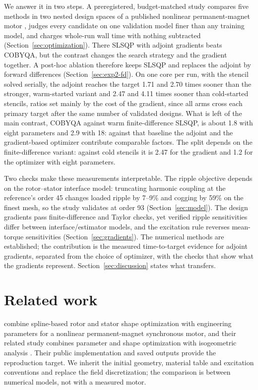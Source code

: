 \documentclass{anvil-paper}
\begin{document}
We answer it in two steps. A preregistered, budget-matched study compares
five methods in two nested design spaces of a published nonlinear
permanent-magnet motor \citep{wiesheu2024spline}, judges every candidate
on one validation model finer than any training model, and charges
whole-run wall time with nothing subtracted (Section~\ref{sec:optimization}).
There SLSQP with adjoint gradients beats COBYQA, but the contrast changes
the search strategy and the gradient together. A post-hoc ablation
therefore keeps SLSQP and replaces the adjoint by forward differences
(Section~\ref{sec:exp2-fd}). On one core per run, with the stencil solved
serially, the adjoint reaches the target 1.71 and 2.70 times sooner than
the stronger, warm-started variant and 2.47 and 4.11 times sooner than
cold-started stencils, ratios set mainly by the cost of the gradient, since
all arms cross each primary target after the same number of validated
designs.
What is left of the main contrast, COBYQA against warm finite-difference
SLSQP, is about 1.8 with eight parameters and 2.9 with 18: against that
baseline the adjoint and the gradient-based optimizer contribute comparable
factors. The split depends on the finite-difference variant: against cold
stencils it is 2.47 for the gradient and 1.2 for the optimizer with eight
parameters.

Two checks make these measurements interpretable. The ripple objective
depends on the rotor--stator interface model: truncating harmonic coupling
at the reference's order 45 changes loaded ripple by 7--9\% and cogging by
59\% on the finest mesh, so the study validates at order 93
(Section~\ref{sec:model}). The design gradients pass finite-difference and
Taylor checks, yet verified ripple sensitivities differ between
interface/estimator models, and the excitation rule reverses mean-torque
sensitivities (Section~\ref{sec:gradients}). The numerical methods are
established; the contribution is the measured time-to-target evidence for
adjoint gradients, separated from the choice of optimizer, with the checks
that show what the gradients represent. Section~\ref{sec:discussion} states
what transfers.

\section{Related work}
\citet{wiesheu2024spline} combine spline-based rotor and stator shape
optimization with engineering parameters for a nonlinear permanent-magnet
synchronous motor, and their related study combines parameter and shape
optimization with isogeometric analysis \citep{wiesheu2025combined}. Their
public implementation and saved outputs provide the reproduction target.
We inherit the initial geometry, material table and excitation
conventions and replace the field discretization; the comparison is
between numerical models, not with a measured motor.
\end{document}
